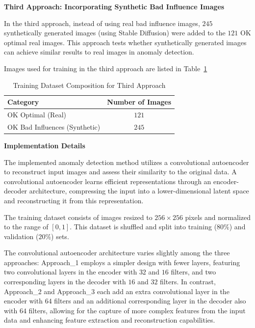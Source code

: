 \documentclass[12pt,DIV14,BCOR12mm,a4paper,footinclude=false,headinclude,parskip=half-,twoside,openright,cleardoublepage=empty,toc=index,bibliography=totoc,listof=totoc]{scrreprt}
\numberwithin{equation}{chapter}
\begin{document}
\textbf{Third Approach: Incorporating Synthetic Bad Influence Images}

In the third approach, instead of using real bad influence images, $245$ synthetically generated images (using Stable Diffusion) were added to the $121$ OK optimal real images. This approach tests whether synthetically generated images can achieve similar results to real images in anomaly detection.

Images used for training in the third approach are listed in Table~\ref{tab:third-approach}

\begin{table} 
    \centering
    \caption{Training Dataset Composition for Third Approach}
    \label{tab:third-approach}
    \begin{tabular}{lc} %
        \toprule
        \textbf{Category} & \textbf{Number of Images} \\ 
        \midrule
        OK Optimal (Real) & $121$ \\ 
        OK Bad Influences (Synthetic) & $245$ \\ 
        \bottomrule
    \end{tabular}
\end{table}

\textbf{Implementation Details}

The implemented anomaly detection method utilizes a convolutional autoencoder to reconstruct input images and assess their similarity to the original data. A convolutional autoencoder learns efficient representations through an encoder-decoder architecture, compressing the input into a lower-dimensional latent space and reconstructing it from this representation.

The training dataset consists of images resized to \(256 \times 256\) pixels and normalized to the range of \([0, 1]\). This dataset is shuffled and split into training (\(80\%\)) and validation (\(20\%\)) sets.

The convolutional autoencoder architecture varies slightly among the three approaches: Approach\_1 employs a simpler design with fewer layers, featuring two convolutional layers in the encoder with $32$ and $16$ filters, and two corresponding layers in the decoder with $16$ and $32$ filters. In contrast, Approach\_2 and Approach\_3 each add an extra convolutional layer in the encoder with $64$ filters and an additional corresponding layer in the decoder also with $64$ filters, allowing for the capture of more complex features from the input data and enhancing feature extraction and reconstruction capabilities.
\end{document}
